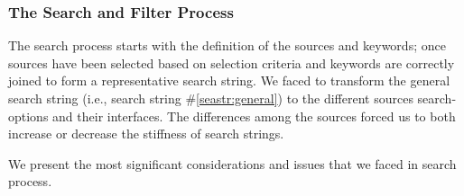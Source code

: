 \subsubsection{The Search and Filter Process}
\label{subsub:searchandfilter}
The search process starts with the definition of the sources and keywords; once sources have been selected based on selection criteria and keywords are correctly joined to form a representative search string. We faced to transform the general search string (i.e., search string \#\ref{seastr:general}) to the different sources search-options and their interfaces. The differences among the sources forced us to both increase or decrease the stiffness of search strings.

We present the most significant considerations and issues that we faced in search process.

